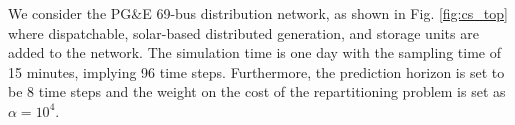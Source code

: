 \fi 
We consider the PG\&E 69-bus distribution network, as shown in Fig. \ref{fig:cs_top} where dispatchable, solar-based distributed generation, and storage units are added to the network. 
The simulation time is one day with the sampling time of 15 minutes, implying 96 time steps. Furthermore, the prediction horizon is set to be 8 time steps and the weight on the cost of the repartitioning problem is set as $\alpha=10^4$. %


